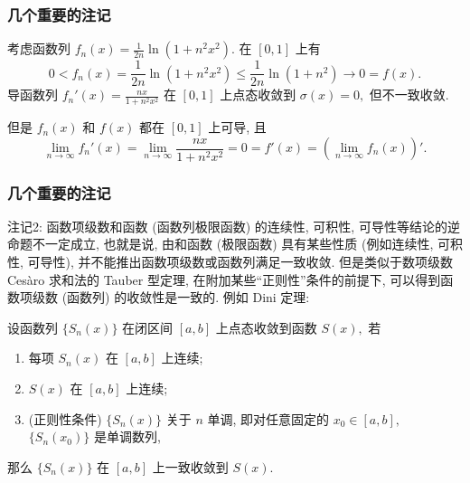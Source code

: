 
\begin{frame}
\frametitle{几个重要的注记}

\begin{eg}[可导性不需要一致收敛性的例子]
考虑函数列 $f_n(x) = \frac{1}{2n} \ln(1 + n^2 x^2).$ 在 $[0, 1]$ 上有
\[
0 < f_n(x) = \frac{1}{2n} \ln(1 + n^2 x^2) \leqslant \frac{1}{2n} \ln(1 + n^2) \to 0 = f(x).
\]
导函数列 $f_n'(x) = \frac{nx}{1 + n^2 x^2}$ 在 $[0, 1]$ 上点态收敛到 $\sigma(x) = 0,$ 但不一致收敛.

\vspace{1em}

但是 $f_n(x)$ 和 $f(x)$ 都在 $[0, 1]$ 上可导, 且
\[
\lim_{n\to\infty} f_n'(x) = \lim_{n\to\infty} \frac{nx}{1 + n^2 x^2} = 0 = f'(x) = \left( \lim_{n\to\infty} f_n(x) \right)'.
\]
\end{eg}

\end{frame}


\begin{frame}
\frametitle{几个重要的注记}

{\color{red}} 注记2: 函数项级数和函数 (函数列极限函数) 的连续性, 可积性, 可导性等结论的逆命题\alert{不一定成立}, 也就是说, 由和函数 (极限函数) 具有某些性质 (例如连续性, 可积性, 可导性), 并不能推出函数项级数或函数列满足一致收敛.
\pause
但是类似于数项级数 Cesàro 求和法的 Tauber 型定理, 在附加某些``正则性''条件的前提下, 可以得到函数项级数 (函数列) 的收敛性是一致的. 例如 Dini 定理:

\pause

\begin{thm}[Dini 定理]
设函数列 $\{S_n(x)\}$ 在闭区间 $[a, b]$ 上点态收敛到函数 $S(x),$ 若
\begin{enumerate}
\item 每项 $S_n(x)$ 在 $[a, b]$ 上连续;
\item $S(x)$ 在 $[a, b]$ 上连续;
\item (\alert{正则性条件}) $\{S_n(x)\}$ 关于 $n$ 单调, 即对任意固定的 $x_0 \in [a, b],$ $\{S_n(x_0)\}$ 是单调数列,
\end{enumerate}
那么 $\{S_n(x)\}$ 在 $[a, b]$ 上一致收敛到 $S(x).$
\end{thm}

\end{frame}


